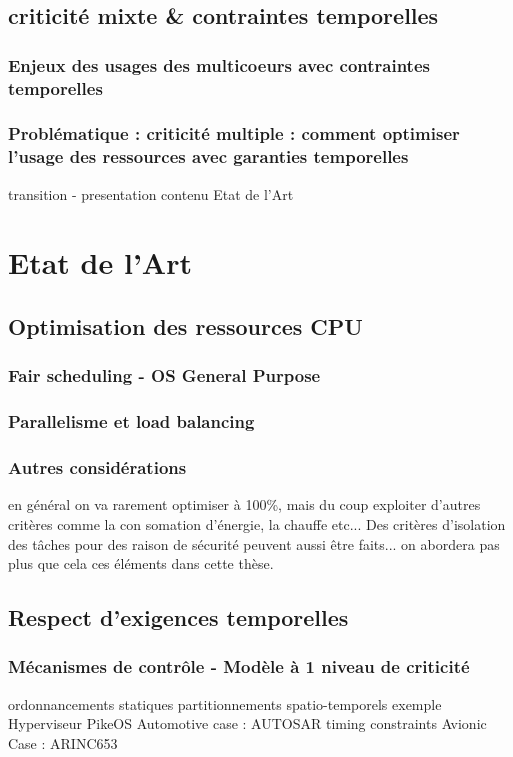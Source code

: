 \documentclass[french, a4paper, 11pt, twoside]{StyleThese}
\begin{document}
    \section{criticité mixte \& contraintes temporelles}
        \subsection{Enjeux des usages des multicoeurs avec contraintes temporelles}
        \subsection{Problématique :  criticité multiple : comment optimiser l'usage des ressources avec garanties temporelles}
transition - presentation contenu Etat de l'Art
\chapter{Etat de l'Art}
    \section{Optimisation des ressources CPU}
        \subsection{Fair scheduling - OS General Purpose}
        \subsection{Parallelisme et load balancing}
        \subsection{Autres considérations}
            en général on va rarement optimiser à 100\%, mais du coup exploiter d'autres critères comme la con somation d'énergie, la chauffe etc... Des critères d'isolation des tâches pour des raison de sécurité peuvent aussi être faits... on abordera pas plus que cela ces éléments dans cette thèse.
    \section{Respect d'exigences temporelles}
        \subsection{Mécanismes de contrôle - Modèle à 1 niveau de criticité}
            ordonnancements statiques
            partitionnements spatio-temporels
                exemple Hyperviseur PikeOS
            Automotive case : AUTOSAR
                timing constraints
            Avionic Case : ARINC653
\end{document}
